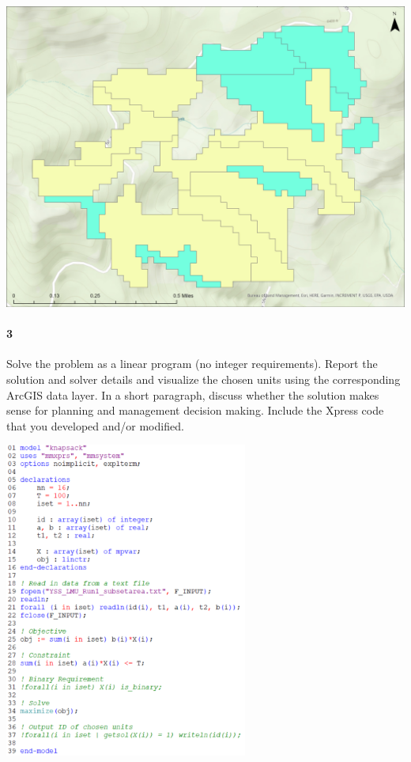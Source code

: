 \documentclass[12pt]{article}
\newenvironment{fullbox}{\begin{lrbox}{\savefullbox}\begin{minipage}{\dimexpr\textwidth-2\fboxsep\relax}}{\end{minipage}\end{lrbox}\begin{center}\framebox[\textwidth]{\usebox{\savefullbox}}\end{center}}
\newenvironment{pbox}[1][]{\begin{fullbox}\ifx#1\empty\else\paragraph{#1}\fi}{\end{fullbox}}
\theoremstyle{definition}
\begin{document}
\begin{center}
    \includegraphics[width=\textwidth]{map2.png}
\end{center}





\newpage
\begin{pbox}[3]
     Solve the problem as a linear program (no integer requirements). Report the solution and solver details and visualize the chosen units using the corresponding ArcGIS data layer. In a short paragraph, discuss whether the solution makes sense for planning and management decision making. Include the Xpress code that you developed and/or modified.
\end{pbox}

\begin{center}
    \includegraphics[width=0.6\textwidth]{code1.png}
\end{center}
\end{document}
